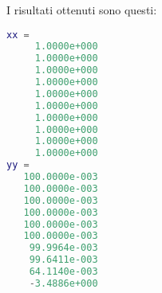 
I risultati ottenuti sono questi:
\begin{lstlisting}[language=matlab, basicstyle = \small]
xx =
     1.0000e+000
     1.0000e+000
     1.0000e+000
     1.0000e+000
     1.0000e+000
     1.0000e+000
     1.0000e+000
     1.0000e+000
     1.0000e+000
     1.0000e+000
yy =
   100.0000e-003
   100.0000e-003
   100.0000e-003
   100.0000e-003
   100.0000e-003
   100.0000e-003
    99.9964e-003
    99.6411e-003
    64.1140e-003
    -3.4886e+000
\end{lstlisting}